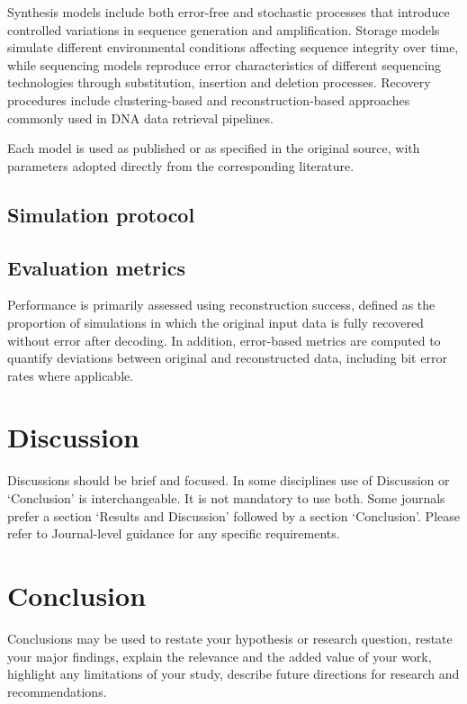 \documentclass[pdflatex,sn-mathphys-num]{sn-jnl}%
\theoremstyle{thmstyleone}%
\theoremstyle{thmstyletwo}%
\theoremstyle{thmstylethree}%
\begin{document}
Synthesis models include both error-free and stochastic processes that introduce controlled variations in sequence generation and amplification. Storage models simulate different environmental conditions affecting sequence integrity over time, while sequencing models reproduce error characteristics of different sequencing technologies through substitution, insertion and deletion processes. Recovery procedures include clustering-based and reconstruction-based approaches commonly used in DNA data retrieval pipelines.

Each model is used as published or as specified in the original source, with parameters adopted directly from the corresponding literature.

\subsection{Simulation protocol}


\subsection{Evaluation metrics}
Performance is primarily assessed using reconstruction success, defined as the proportion of simulations in which the original input data is fully recovered without error after decoding. In addition, error-based metrics are computed to quantify deviations between original and reconstructed data, including bit error rates where applicable.

\section{Discussion}\label{sec12}

Discussions should be brief and focused. In some disciplines use of Discussion or `Conclusion' is interchangeable. It is not mandatory to use both. Some journals prefer a section `Results and Discussion' followed by a section `Conclusion'. Please refer to Journal-level guidance for any specific requirements. 

\section{Conclusion}\label{sec13}

Conclusions may be used to restate your hypothesis or research question, restate your major findings, explain the relevance and the added value of your work, highlight any limitations of your study, describe future directions for research and recommendations. 
\end{document}

